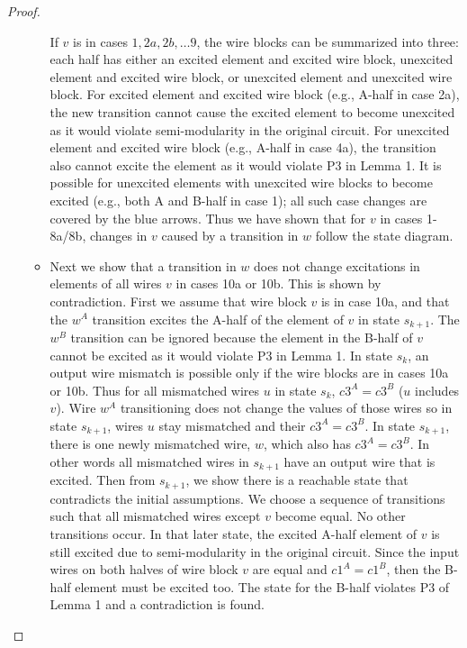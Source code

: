\documentclass[12pt]{report}
\begin{document}
\begin{proof}
\begin{itemize}
\begin{itemize}
If $v$ is in cases $1,2a,2b,\dots9$, the wire blocks can be summarized into three: each half has either an excited element and excited wire block, unexcited element and excited wire block, or unexcited element and unexcited wire block.  For excited element and excited wire block (e.g., A-half in case 2a), the new transition cannot cause the excited element to become unexcited as it would violate semi-modularity in the original circuit.  For unexcited element and excited wire block (e.g., A-half in case 4a), the transition also cannot excite the element as it would violate P3 in Lemma 1.  It is possible for unexcited elements with unexcited wire blocks to become excited (e.g., both A and B-half in case 1); all such case changes are covered by the blue arrows.  Thus we have shown that for $v$ in cases 1-8a/8b, changes in $v$ caused by a transition in $w$ follow the state diagram.  
\item
Next we show that a transition in $w$ does not change excitations in elements of all wires $v$ in cases 10a or 10b.  This is shown by contradiction.  
First we assume that wire block $v$ is in case 10a, and that the $w^A$ transition excites the A-half of the element of $v$ in state $s_{k+1}$.  The $w^B$ transition can be ignored because the element in the B-half of $v$ cannot be excited as it would violate P3 in Lemma 1.  In state $s_k$, an output wire mismatch is possible only if the wire blocks are in cases 10a or 10b.  Thus for all mismatched wires $u$ in state $s_k$, $c3^A=c3^B$ (${u}$ includes $v$).  Wire $w^A$ transitioning does not change the values of those wires so in state $s_{k+1}$, wires $u$ stay mismatched and their $c3^A=c3^B$.  In state $s_{k+1}$, there is one newly mismatched wire, $w$, which also has $c3^A=c3^B$.  In other words all mismatched wires in $s_{k+1}$ have an output wire that is excited. Then from $s_{k+1}$, we show there is a reachable state that contradicts the initial assumptions.  We choose a sequence of transitions such that all mismatched wires except $v$ become equal.  No other transitions occur.  In that later state, the excited A-half element of $v$ is still excited due to semi-modularity in the original circuit.  %
Since the input wires on both halves of wire block $v$ are equal and $c1^A=c1^B$, then the B-half element must be excited too.  The state for the B-half violates P3 of Lemma 1 and a contradiction is found. %

\end{itemize}
\end{itemize}
\end{proof}
\end{document}

